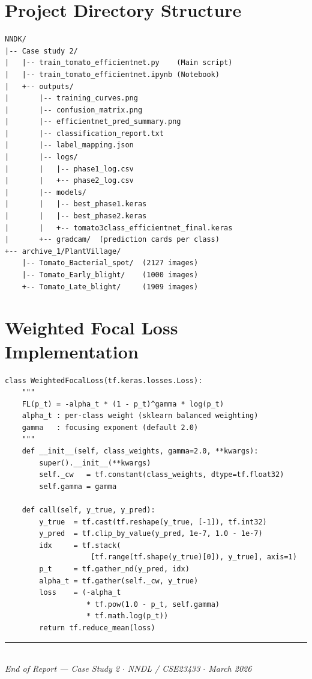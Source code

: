 \documentclass[12pt, a4paper, onecolumn]{IEEEtran}
\begin{document}
\appendix
\section{Project Directory Structure}

\begin{lstlisting}[language={}, caption={Project Directory Structure},
                   numbers=none, label={lst:dir}]
NNDK/
|-- Case study 2/
|   |-- train_tomato_efficientnet.py    (Main script)
|   |-- train_tomato_efficientnet.ipynb (Notebook)
|   +-- outputs/
|       |-- training_curves.png
|       |-- confusion_matrix.png
|       |-- efficientnet_pred_summary.png
|       |-- classification_report.txt
|       |-- label_mapping.json
|       |-- logs/
|       |   |-- phase1_log.csv
|       |   +-- phase2_log.csv
|       |-- models/
|       |   |-- best_phase1.keras
|       |   |-- best_phase2.keras
|       |   +-- tomato3class_efficientnet_final.keras
|       +-- gradcam/  (prediction cards per class)
+-- archive_1/PlantVillage/
    |-- Tomato_Bacterial_spot/  (2127 images)
    |-- Tomato_Early_blight/    (1000 images)
    +-- Tomato_Late_blight/     (1909 images)
\end{lstlisting}

\section{Weighted Focal Loss Implementation}

\begin{lstlisting}[caption={Weighted Focal Loss --- Custom Keras Loss Class},
                   label={lst:focal}]
class WeightedFocalLoss(tf.keras.losses.Loss):
    """
    FL(p_t) = -alpha_t * (1 - p_t)^gamma * log(p_t)
    alpha_t : per-class weight (sklearn balanced weighting)
    gamma   : focusing exponent (default 2.0)
    """
    def __init__(self, class_weights, gamma=2.0, **kwargs):
        super().__init__(**kwargs)
        self._cw   = tf.constant(class_weights, dtype=tf.float32)
        self.gamma = gamma

    def call(self, y_true, y_pred):
        y_true  = tf.cast(tf.reshape(y_true, [-1]), tf.int32)
        y_pred  = tf.clip_by_value(y_pred, 1e-7, 1.0 - 1e-7)
        idx     = tf.stack(
                    [tf.range(tf.shape(y_true)[0]), y_true], axis=1)
        p_t     = tf.gather_nd(y_pred, idx)
        alpha_t = tf.gather(self._cw, y_true)
        loss    = (-alpha_t
                   * tf.pow(1.0 - p_t, self.gamma)
                   * tf.math.log(p_t))
        return tf.reduce_mean(loss)
\end{lstlisting}

\vspace{8mm}
\begin{center}
  \rule{0.4\linewidth}{0.4pt}\\[4pt]
  \small\textit{End of Report --- Case Study 2 $\cdot$ NNDL / CSE23433 $\cdot$ March 2026}
\end{center}
\end{document}
